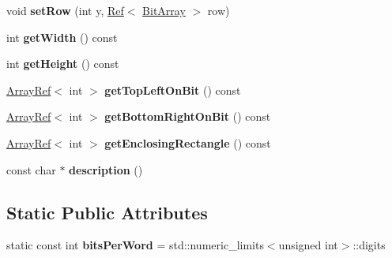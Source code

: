 \begin{DoxyCompactItemize}
\item 
\mbox{\label{classzxing_1_1_bit_matrix_aef65aecedad6350a2024025601c78630}} 
void {\bfseries set\+Row} (int y, \mbox{\hyperlink{classzxing_1_1_ref}{Ref}}$<$ \mbox{\hyperlink{classzxing_1_1_bit_array}{Bit\+Array}} $>$ row)
\item 
\mbox{\label{classzxing_1_1_bit_matrix_a5e83f7f7ecd79da0a7c6afd7295898d2}} 
int {\bfseries get\+Width} () const
\item 
\mbox{\label{classzxing_1_1_bit_matrix_a6296a8155fd4e2ebd8a6fffa5c1ec378}} 
int {\bfseries get\+Height} () const
\item 
\mbox{\label{classzxing_1_1_bit_matrix_a5d9e7854a64e9096fbea465232cd948d}} 
\mbox{\hyperlink{classzxing_1_1_array_ref}{Array\+Ref}}$<$ int $>$ {\bfseries get\+Top\+Left\+On\+Bit} () const
\item 
\mbox{\label{classzxing_1_1_bit_matrix_aa2b5afd6a7e37b1f9e8a8423c717226f}} 
\mbox{\hyperlink{classzxing_1_1_array_ref}{Array\+Ref}}$<$ int $>$ {\bfseries get\+Bottom\+Right\+On\+Bit} () const
\item 
\mbox{\label{classzxing_1_1_bit_matrix_a61e1161d57ced5927d2f74b8444c21ca}} 
\mbox{\hyperlink{classzxing_1_1_array_ref}{Array\+Ref}}$<$ int $>$ {\bfseries get\+Enclosing\+Rectangle} () const
\item 
\mbox{\label{classzxing_1_1_bit_matrix_ab449b02d5ea3ebbd672551ae65f731a7}} 
const char $\ast$ {\bfseries description} ()
\end{DoxyCompactItemize}
\subsection*{Static Public Attributes}
\begin{DoxyCompactItemize}
\item 
\mbox{\label{classzxing_1_1_bit_matrix_a3630dac43b8470a674ae595faa470a63}} 
static const int {\bfseries bits\+Per\+Word} = std\+::numeric\+\_\+limits$<$unsigned int$>$\+::digits
\end{DoxyCompactItemize}
